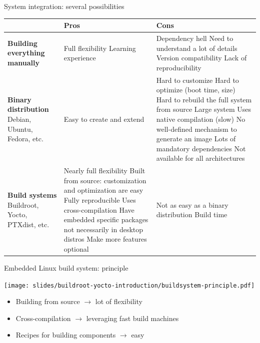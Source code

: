 \begin{frame}{System integration: several possibilities}
  \tiny
  \begin{tabularx}{11cm}{|X|X|X|}
    \hline
    & {\bf Pros} & {\bf Cons} \\
    \hline
    {\bf Building everything manually} &
    Full flexibility \newline
    Learning experience &
    Dependency hell \newline
    Need to understand a lot of details \newline
    Version compatibility \newline
    Lack of reproducibility \\
    \hline
    {\bf Binary distribution} \newline Debian, Ubuntu, Fedora, etc.
    &
    Easy to create and extend
    &
    Hard to customize \newline
    Hard to optimize (boot time, size) \newline
    Hard to rebuild the full system from source \newline
    Large system \newline
    Uses native compilation (slow) \newline
    No well-defined mechanism to generate an image \newline
    Lots of mandatory dependencies \newline
    Not available for all architectures \\
    \hline
    {\bf Build systems} \newline Buildroot, Yocto, PTXdist, etc.
    &
    Nearly full flexibility \newline
    Built from source: customization and optimization are easy \newline
    Fully reproducible \newline
    Uses cross-compilation \newline
    Have embedded specific packages not necessarily in desktop distros \newline
    Make more features optional
    &
    Not as easy as a binary distribution \newline
    Build time \\
    \hline
  \end{tabularx}
\end{frame}

\begin{frame}{Embedded Linux build system: principle}
  \begin{center}
    \texttt{[image: slides/buildroot-yocto-introduction/buildsystem-principle.pdf]}
  \end{center}
  \begin{itemize}
  \item Building from source $\rightarrow$ lot of flexibility
  \item Cross-compilation $\rightarrow$ leveraging fast build machines
  \item Recipes for building components $\rightarrow$ easy
  \end{itemize}
\end{frame}

